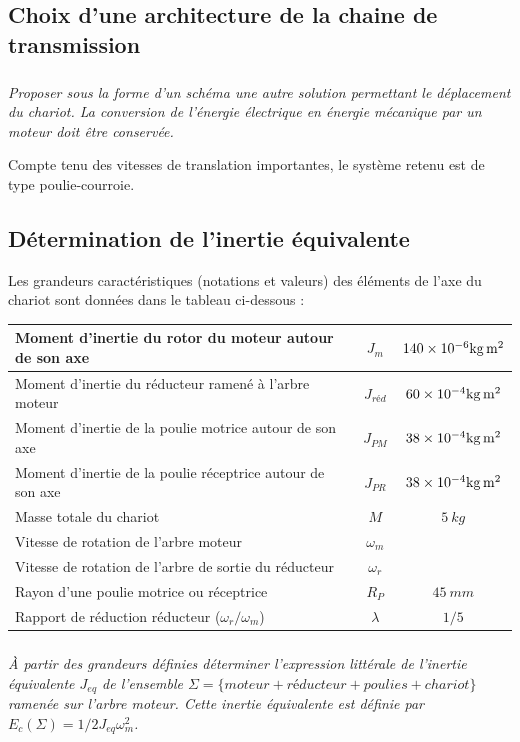\documentclass[10pt,fleqn]{article} %
\begin{document}
\begin{multicols}{2}
\subsection*{Choix d’une architecture de la chaine de transmission}
\subparagraph{}
\textit{Proposer sous la forme d’un schéma une autre solution permettant le déplacement du chariot. La conversion de l’énergie électrique en énergie mécanique par un moteur doit être conservée.}

Compte tenu des vitesses de translation importantes, le système retenu est de type poulie-courroie.

\subsection*{Détermination de l’inertie équivalente} 
Les grandeurs caractéristiques (notations et valeurs) des éléments de l’axe du chariot sont données dans le tableau ci-dessous :
\begin{center}
\begin{tabular}{|p{3cm}|c|c|}
\hline
Moment d’inertie du rotor du moteur autour de son axe&	$J_m$ & $\num{140d-6}\si{kg.m^2}$ \\ \hline
Moment d’inertie du réducteur ramené à l’arbre moteur&	$J_{réd}$ & $\num{60d-4}\si{kg.m^2}$ \\ \hline
Moment d’inertie de la poulie motrice autour de son axe&	$J_{PM}$	&$ \num{38d-4}\si{kg.m^2}$ \\ \hline
Moment d’inertie de la poulie réceptrice autour de son axe&	$J_{PR}$ & $\num{38d-4}\si{kg.m^2}$ \\ \hline
Masse totale du chariot	&$M$ &$\SI{5}{kg}$ \\ \hline
Vitesse de rotation de l’arbre moteur &$\omega_m$ &  \\ \hline
Vitesse de rotation de l’arbre de sortie du réducteur	&$\omega_r$&  \\ \hline
Rayon d’une poulie motrice ou réceptrice	& $R_P$ &$\SI{45}{mm}$ \\ \hline
Rapport de réduction réducteur ($\omega_r/\omega_m$)	& $\lambda$	&$1/5$ \\ \hline
\end{tabular}
\end{center}

\subparagraph{}
\textit{À partir des grandeurs définies déterminer l’expression littérale de l’inertie équivalente $J_{eq}$ de l’ensemble $\Sigma=\{moteur+réducteur+poulies+chariot\}$ ramenée sur l’arbre moteur. Cette inertie équivalente est définie par $E_c (\Sigma)=1/2 J_{eq} \omega_m^2$.}


\end{multicols}
\end{document}
